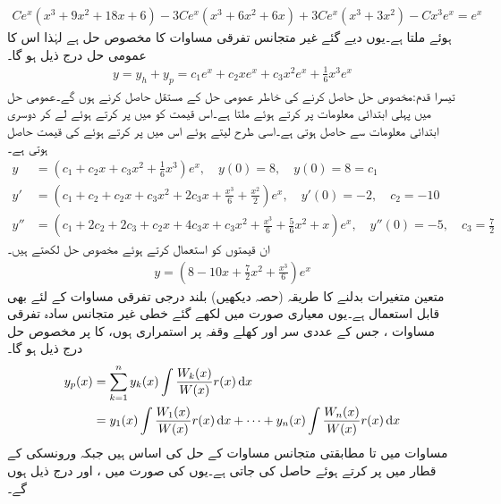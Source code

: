 \begin{align*}
Ce^x(x^3+9x^2+18x+6)-3Ce^x(x^3+6x^2+6x)+3Ce^x(x^3+3x^2)-Cx^3e^x=e^{x}
\end{align*}
ہوئے  ملتا ہے۔یوں دیے گئے غیر متجانس تفرقی مساوات کا مخصوص حل  ہے لہٰذا اس کا عمومی حل درج ذیل ہو گا۔
\begin{align*}
y=y_h+y_p=c_1e^x+c_2xe^x+c_3x^2e^x+\frac{1}{6}x^3e^x
\end{align*}
تیسرا قدم:\quad مخصوص حل حاصل کرنے کی خاطر عمومی حل کے مستقل حاصل کرنے ہوں گے۔عمومی حل میں پہلی ابتدائی معلومات  پر کرتے ہوئے  ملتا ہے۔اس قیمت کو  میں پر کرتے ہوئے  لے کر دوسری ابتدائی معلومات  سے  حاصل ہوتی ہے۔اسی طرح  لیتے ہوئے اس میں  پر کرتے ہوئے  کی قیمت حاصل ہوتی ہے۔
\begin{align*}
y&=(c_1+c_2x+c_3x^2+\frac{1}{6}x^3)e^x, \quad y(0)=8, \quad y(0)=8=c_1\\
y'&=(c_1+c_2+c_2x+c_3x^2+2c_3x+\frac{x^3}{6}+\frac{x^2}{2})e^x, \quad y'(0)=-2, \quad c_2=-10\\
y''&=(c_1+2c_2+2c_3+c_2x+4c_3x+c_3x^2+\frac{x^3}{6}+\frac{5}{6}x^2+x)e^x,\quad y''(0)=-5, \quad c_3=\frac{7}{2}
\end{align*} 
ان قیمتوں کو استعمال کرتے ہوئے مخصوص حل لکھتے ہیں۔
\begin{align*}
y=\left(8-10x+\frac{7}{2}x^2+\frac{x^3}{6}\right)e^x
\end{align*}
متعین متغیرات بدلنے کا طریقہ (حصہ  دیکھیں) بلند درجی تفرقی مساوات  کے لئے بھی قابل استعمال ہے۔یوں معیاری صورت میں لکھے گئے خطی غیر متجانس سادہ تفرقی مساوات  ، جس کے عددی سر اور  کھلے وقفہ  پر استمراری ہوں، کا   پر مخصوص حل  درج ذیل ہو گا۔
\begin{gather}
\begin{aligned}\label{مساوات_سادہ_بلند_متعین_متغیرات_بدلنے_الف}
y_p(x)&=\sum_{k=1}^{n} y_k(x)\int \frac{W_k(x)}{W(x)} r(x)\dif x\\
&=y_1(x)\int \frac{W_1(x)}{W(x)}r(x)\dif x+\cdots+y_n(x)\int \frac{W_n(x)}{W(x)}r(x)\dif x
\end{aligned}
\end{gather}
مساوات  میں  تا  مطابقتی متجانس مساوات  کے حل کی اساس ہیں جبکہ ورونسکی  کے  قطار میں  پر کرتے ہوئے  حاصل کی جاتی ہے۔یوں  کی صورت میں ،  اور  درج ذیل ہوں گے۔
